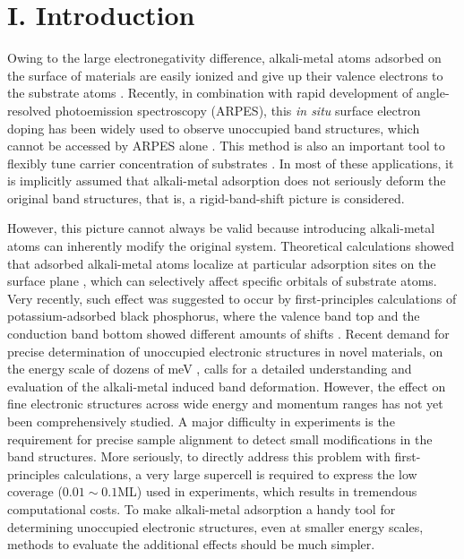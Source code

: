\documentclass[reprint,secnumarabic,amssymb, nobibnotes, aps, prl,superscriptaddress,showpacs]{revtex4-1}
\begin{document}
\maketitle 

\section{I. Introduction}
Owing to the large electronegativity difference, alkali-metal atoms adsorbed on the surface of materials are easily ionized and give up their valence electrons to the substrate atoms \cite{kiejna1981,aruga1989,stampfl1994, diehl1997}. Recently, in combination with rapid development of angle-resolved photoemission spectroscopy (ARPES), this \textit{in situ} surface electron doping has been widely used to observe unoccupied band structures, which cannot be accessed by ARPES alone \cite{zhu2011,zhang2014,zhu2015,feng2016}. This method is also an important tool to flexibly tune carrier concentration of substrates \cite{ohta2006, kim2015,miyata2015,ren2017}. In most of these applications, it is implicitly assumed that alkali-metal adsorption does not seriously deform the original band structures, that is, a rigid-band-shift picture is considered.

However, this picture cannot always be valid because introducing alkali-metal atoms can inherently modify the original system. Theoretical calculations showed that adsorbed alkali-metal atoms localize at particular adsorption sites on the surface plane \cite{stampfl1994, diehl1997}, which can selectively affect specific orbitals of substrate atoms. Very recently, such effect was suggested to occur by first-principles calculations of potassium-adsorbed black phosphorus, where the valence band top and the conduction band bottom showed different amounts of shifts \cite{kim2017}. Recent demand for precise determination of unoccupied electronic structures in novel materials, on the energy scale of dozens of meV \cite{zhu2015,feng2016, belopolski2016}, calls for a detailed understanding and evaluation of the alkali-metal induced band deformation. However, the effect on fine electronic structures across wide energy and momentum ranges has not yet been comprehensively studied. A major difficulty in experiments is the requirement for precise sample alignment to detect small modifications in the band structures. More seriously, to directly address this problem with first-principles calculations, a very large supercell is required to express the low coverage ($0.01\sim0.1$ML) used in experiments, which results in tremendous computational costs. To make alkali-metal adsorption a handy tool for determining unoccupied electronic structures, even at smaller energy scales, methods to evaluate the additional effects should be much simpler.
\end{document}
